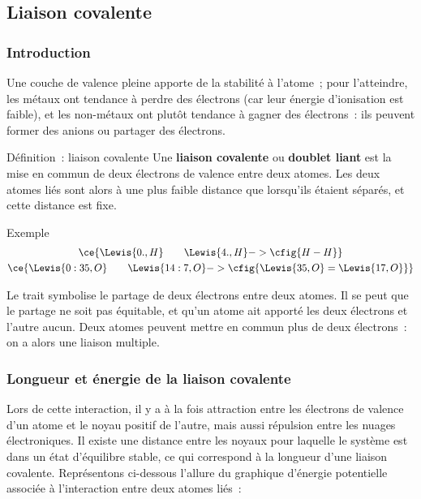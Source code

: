 \documentclass[../main/main.tex]{subfiles}
\begin{document}
\subsection{Liaison covalente}
\subsubsection{Introduction}
Une couche de valence pleine apporte de la stabilité à l'atome~; pour
l'atteindre, les métaux ont tendance à perdre des électrons (car leur énergie
d'ionisation est faible), et les non-métaux ont plutôt tendance à gagner des
électrons~: ils peuvent former des anions ou partager des électrons.

\begin{tdefi}{Définition~: liaison covalente}
    Une \textbf{liaison covalente} ou \textbf{doublet liant} est la mise en
    commun de deux électrons de valence entre deux atomes. Les deux atomes liés
    sont alors à une plus faible distance que lorsqu'ils étaient séparés, et
    cette distance est fixe.
\end{tdefi}

\begin{rexem}{Exemple}
    \vspace{-12pt}
    \begin{gather*}
        \ce{\Lewis{0.,H} \qquad \Lewis{4.,H} -> \cfig{H-H}}
        \\
        \ce{\Lewis{0:35,O} \qquad \Lewis{14:7,O} ->
        \cfig{\Lewis{35,O}=\Lewis{17,O}}}
    \end{gather*}
\end{rexem}

Le trait symbolise le partage de deux électrons entre deux atomes. Il se peut
que le partage ne soit pas équitable, et qu'un atome ait apporté les deux
électrons et l'autre aucun. Deux atomes peuvent mettre en commun plus de deux
électrons~: on a alors une liaison multiple.

\subsubsection{Longueur et énergie de la liaison covalente}

Lors de cette interaction, il y a à la fois attraction entre les électrons de
valence d'un atome et le noyau positif de l'autre, mais aussi répulsion entre
les nuages électroniques. Il existe une distance entre les noyaux pour laquelle
le système est dans un état d'équilibre stable, ce qui correspond à la longueur
d'une liaison covalente. Représentons ci-dessous l'allure du graphique d'énergie
potentielle associée à l'interaction entre deux atomes liés~:
\end{document}

